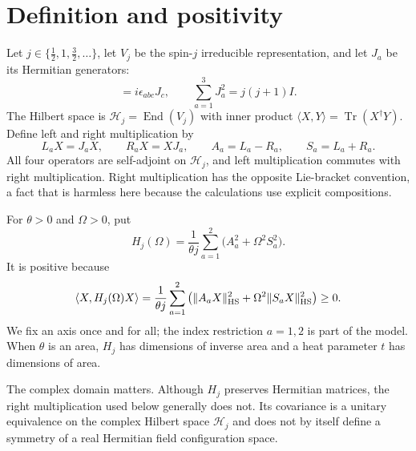 \documentclass[11pt,a4paper]{article}
\theoremstyle{remark}\newtheorem{remark}[theorem]{Remark}
\newcommand{\End}{\operatorname{End}}
\newcommand{\Tr}{\operatorname{Tr}}
\newcommand{\Hj}{\mathcal H_j}
\begin{document}
\section{Definition and positivity}
Let $j\in\{\tfrac12,1,\tfrac32,\ldots\}$, let $V_j$ be the spin-$j$ irreducible representation, and let $J_a$ be its Hermitian generators:
\begin{equation}
 [J_a,J_b]=i\epsilon_{abc}J_c,\qquad
 \sum_{a=1}^3J_a^2=j(j+1)I.
\end{equation}
The Hilbert space is $\Hj=\End(V_j)$ with inner product $\langle X,Y\rangle=\Tr(X^\dagger Y)$.
Define left and right multiplication by
\begin{equation}
 L_aX=J_aX,\qquad R_aX=XJ_a,\qquad
 A_a=L_a-R_a,\qquad S_a=L_a+R_a.
\end{equation}
All four operators are self-adjoint on $\Hj$, and left multiplication commutes with right multiplication.
Right multiplication has the opposite Lie-bracket convention, a fact that is harmless here because the calculations use explicit compositions.

For $\theta>0$ and $\Omega>0$, put
\begin{equation}\label{eq:H}
 H_j(\Omega)=\frac{1}{\theta j}\sum_{a=1}^2
 \big(A_a^2+\Omega^2S_a^2\big).
\end{equation}
It is positive because
\begin{equation}
 \langle X,H_j(\Omega)X\rangle
 =\frac{1}{\theta j}\sum_{a=1}^2
 \big(\|A_aX\|_{\rm HS}^2+\Omega^2\|S_aX\|_{\rm HS}^2\big)\ge0.
\end{equation}
We fix an axis once and for all; the index restriction $a=1,2$ is part of the model.
When $\theta$ is an area, $H_j$ has dimensions of inverse area and a heat parameter $t$ has dimensions of area.

The complex domain matters.
Although $H_j$ preserves Hermitian matrices, the right multiplication used below generally does not.
Its covariance is a unitary equivalence on the complex Hilbert space $\Hj$ and does not by itself define a symmetry of a real Hermitian field configuration space.
\end{document}
